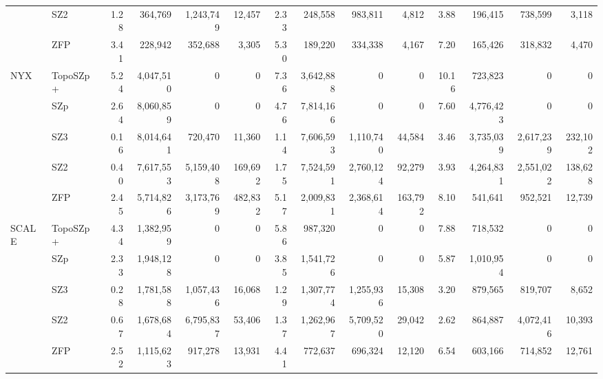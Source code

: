 \begin{tabular}{@{}llrrrrrrrrrrrr@{}}
 & SZ2 & 1.28 & 364{,}769 & 1{,}243{,}749 & 12{,}457 & 2.33 & 248{,}558 & 983{,}811 & 4{,}812 & 3.88 & 196{,}415 & 738{,}599 & 3{,}118 \\
 & ZFP & 3.41 & 228{,}942 & 352{,}688 & 3{,}305 & 5.30 & 189{,}220 & 334{,}338 & 4{,}167 & 7.20 & 165{,}426 & 318{,}832 & 4{,}470 \\
\midrule
NYX & TopoSZp+ & 5.24 & 4{,}047{,}510 & 0 & 0 & 7.36 & 3{,}642{,}888 & 0 & 0 & 10.16 & 723{,}823 & 0 & 0 \\
 & SZp & 2.64 & 8{,}060{,}859 & 0 & 0 & 4.76 & 7{,}814{,}166 & 0 & 0 & 7.60 & 4{,}776{,}423 & 0 & 0 \\
 & SZ3 & 0.16 & 8{,}014{,}641 & 720{,}470 & 11{,}360 & 1.14 & 7{,}606{,}593 & 1{,}110{,}740 & 44{,}584 & 3.46 & 3{,}735{,}039 & 2{,}617{,}239 & 232{,}102 \\
 & SZ2 & 0.40 & 7{,}617{,}553 & 5{,}159{,}408 & 169{,}692 & 1.75 & 7{,}524{,}591 & 2{,}760{,}124 & 92{,}279 & 3.93 & 4{,}264{,}831 & 2{,}551{,}022 & 138{,}628 \\
 & ZFP & 2.45 & 5{,}714{,}826 & 3{,}173{,}769 & 482{,}832 & 5.17 & 2{,}009{,}831 & 2{,}368{,}614 & 163{,}792 & 8.10 & 541{,}641 & 952{,}521 & 12{,}739 \\
\midrule
SCALE & TopoSZp+ & 4.34 & 1{,}382{,}959 & 0 & 0 & 5.86 & 987{,}320 & 0 & 0 & 7.88 & 718{,}532 & 0 & 0 \\
 & SZp & 2.33 & 1{,}948{,}128 & 0 & 0 & 3.85 & 1{,}541{,}726 & 0 & 0 & 5.87 & 1{,}010{,}954 & 0 & 0 \\
 & SZ3 & 0.28 & 1{,}781{,}588 & 1{,}057{,}436 & 16{,}068 & 1.29 & 1{,}307{,}774 & 1{,}255{,}936 & 15{,}308 & 3.20 & 879{,}565 & 819{,}707 & 8{,}652 \\
 & SZ2 & 0.67 & 1{,}678{,}684 & 6{,}795{,}837 & 53{,}406 & 1.37 & 1{,}262{,}967 & 5{,}709{,}520 & 29{,}042 & 2.62 & 864{,}887 & 4{,}072{,}416 & 10{,}393 \\
 & ZFP & 2.52 & 1{,}115{,}623 & 917{,}278 & 13{,}931 & 4.41 & 772{,}637 & 696{,}324 & 12{,}120 & 6.54 & 603{,}166 & 714{,}852 & 12{,}761 \\
\bottomrule
\end{tabular}

